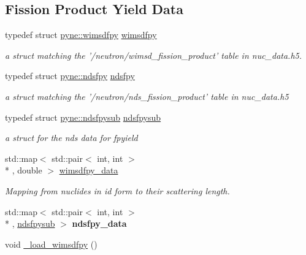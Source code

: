 \subsection*{Fission Product Yield Data}
\begin{DoxyCompactItemize}
\item 
\hypertarget{namespacepyne_a8346e297aba51dd65836af1b9b1e22c6}{typedef struct \hyperlink{structpyne_1_1wimsdfpy}{pyne\-::wimsdfpy} \hyperlink{namespacepyne_a8346e297aba51dd65836af1b9b1e22c6}{wimsdfpy}}\label{namespacepyne_a8346e297aba51dd65836af1b9b1e22c6}

\begin{DoxyCompactList}\small\item\em a struct matching the '/neutron/wimsd\-\_\-fission\-\_\-product' table in nuc\-\_\-data.\-h5. \end{DoxyCompactList}\item 
\hypertarget{namespacepyne_a96952abe65e3f7b41e1b8a93c123f5b1}{typedef struct \hyperlink{structpyne_1_1ndsfpy}{pyne\-::ndsfpy} \hyperlink{namespacepyne_a96952abe65e3f7b41e1b8a93c123f5b1}{ndsfpy}}\label{namespacepyne_a96952abe65e3f7b41e1b8a93c123f5b1}

\begin{DoxyCompactList}\small\item\em a struct matching the '/neutron/nds\-\_\-fission\-\_\-product' table in nuc\-\_\-data.\-h5 \end{DoxyCompactList}\item 
\hypertarget{namespacepyne_a38819ae9154f678484f27f785b29c275}{typedef struct \hyperlink{structpyne_1_1ndsfpysub}{pyne\-::ndsfpysub} \hyperlink{namespacepyne_a38819ae9154f678484f27f785b29c275}{ndsfpysub}}\label{namespacepyne_a38819ae9154f678484f27f785b29c275}

\begin{DoxyCompactList}\small\item\em a struct for the nds data for fpyield \end{DoxyCompactList}\item 
std\-::map$<$ std\-::pair$<$ int, int $>$\\*
, double $>$ \hyperlink{namespacepyne_a2512ebcde5e39e49cd6ed25bb09ff374}{wimsdfpy\-\_\-data}
\begin{DoxyCompactList}\small\item\em Mapping from nuclides in id form to their scattering length. \end{DoxyCompactList}\item 
std\-::map$<$ std\-::pair$<$ int, int $>$\\*
, \hyperlink{structpyne_1_1ndsfpysub}{ndsfpysub} $>$ {\bfseries ndsfpy\-\_\-data}
\item 
\hypertarget{namespacepyne_a32682c82d07a8370677923550dbc9904}{void \hyperlink{namespacepyne_a32682c82d07a8370677923550dbc9904}{\-\_\-load\-\_\-wimsdfpy} ()}\label{namespacepyne_a32682c82d07a8370677923550dbc9904}


\end{DoxyCompactItemize}
